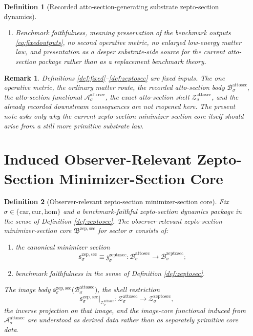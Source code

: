 \documentclass[11pt]{article}
\newcommand{\Car}{\mathrm{car}}
\newcommand{\Cur}{\mathrm{cur}}
\newcommand{\Hom}{\mathrm{hom}}
\newcommand{\AttoSectionBody}[1]{\mathcal B_{#1}^{\mathrm{attosec}}}
\newcommand{\AttoSectionFunctional}[1]{\mathscr A_{#1}^{\mathrm{attosec}}}
\newcommand{\AttoSectionShell}[1]{\mathcal Z_{#1}^{\mathrm{attosec}}}
\newcommand{\ZeptoSectionBody}[1]{\mathcal B_{#1}^{\mathrm{zeptosec}}}
\newcommand{\ZeptoSectionProj}[1]{\Pi_{#1}^{\mathrm{zeptosec}}}
\newcommand{\ZeptoSectionFiber}[2]{\mathcal F_{#1}^{\mathrm{zeptosec}}(#2)}
\newcommand{\ZeptoSectionAttoMin}[1]{\mathfrak z_{#1}^{\mathrm{zeptosec}}}
\newcommand{\ZeptoSectionFunctional}[1]{\mathscr U_{#1}^{\mathrm{zeptosec}}}
\newcommand{\ZeptoSectionShell}[1]{\mathcal Z_{#1}^{\mathrm{zeptosec}}}
\newcommand{\ZeptoMinSectionCore}{\mathfrak B^{\mathrm{zep,sec}}}
\newcommand{\ZeptoMinSection}[1]{\mathfrak s_{#1}^{\mathrm{zep,sec}}}
\newtheorem{definition}{Definition}
\newtheorem{remark}{Remark}
\begin{document}
\begin{definition}[Recorded atto-section-generating substrate zepto-section dynamics]
\begin{enumerate}
\[\begin{array}{l}
    \ZeptoSectionFunctional{\sigma}(q)
    =
    \displaystyle\min_{r\in\ZeptoSectionFiber{\sigma}{\ZeptoSectionProj{\sigma}(q)}}
    \ZeptoSectionFunctional{\sigma}(r)
    \end{array}
    \right\},
    \]
    and
    \[
    \ZeptoSectionProj{\sigma}\big|_{\ZeptoSectionShell{\sigma}}
    :
    \ZeptoSectionShell{\sigma}
    \xrightarrow{\cong}\AttoSectionShell{\sigma}
    \]
    is a diffeomorphism.
    \item Benchmark faithfulness, meaning preservation of the benchmark outputs \eqref{eq:fixedoutputs}, no second operative metric, no enlarged low-energy matter law, and presentation as a deeper substrate-side source for the current atto-section package rather than as a replacement benchmark theory.
\end{enumerate}
\end{definition}

\begin{remark}
Definitions \ref{def:fixed}--\ref{def:zeptosec} are fixed inputs. The one operative metric, the ordinary matter route, the recorded atto-section body \(\AttoSectionBody{\sigma}\), the atto-section functional \(\AttoSectionFunctional{\sigma}\), the exact atto-section shell \(\AttoSectionShell{\sigma}\), and the already recorded downstream consequences are not reopened here. The present note asks only why the current zepto-section minimizer-section core itself should arise from a still more primitive substrate law.
\end{remark}

\section{Induced Observer-Relevant Zepto-Section Minimizer-Section Core}

\begin{definition}[Observer-relevant zepto-section minimizer-section core]
\label{def:sectioncore}
Fix \(\sigma\in\{\Car,\Cur,\Hom\}\) and a benchmark-faithful zepto-section dynamics package in the sense of Definition \ref{def:zeptosec}. The \emph{observer-relevant zepto-section minimizer-section core} \(\ZeptoMinSectionCore\) for sector \(\sigma\) consists of:
\begin{enumerate}
    \item the canonical minimizer section
    \[
    \ZeptoMinSection{\sigma}
    \equiv
    \ZeptoSectionAttoMin{\sigma}
    :
    \AttoSectionBody{\sigma}\to\ZeptoSectionBody{\sigma};
    \]
    \item benchmark faithfulness in the sense of Definition \ref{def:zeptosec}.
\end{enumerate}
The image body \(\ZeptoMinSection{\sigma}\bigl(\AttoSectionBody{\sigma}\bigr)\), the shell restriction
\[
\ZeptoMinSection{\sigma}\big|_{\AttoSectionShell{\sigma}}
:
\AttoSectionShell{\sigma}\to\ZeptoSectionShell{\sigma},
\]
the inverse projection on that image, and the image-core functional induced from \(\AttoSectionFunctional{\sigma}\) are understood as derived data rather than as separately primitive core data.
\end{definition}
\end{document}
